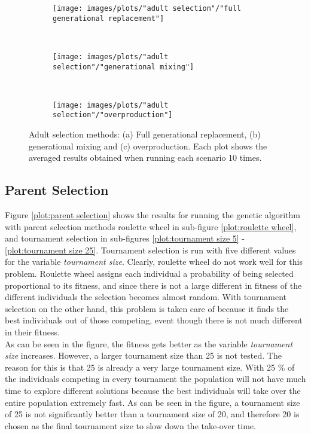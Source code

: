 \begin{figure}[h!]
    \centering
    \begin{subfigure}[b]{0.31\textwidth}
        \texttt{[image: images/plots/"adult selection"/"full generational replacement"]}
        \caption{}
        \hfill
        \label{plot:full generational replacement}
    \end{subfigure}
    ~
    \begin{subfigure}[b]{0.31\textwidth}
        \texttt{[image: images/plots/"adult selection"/"generational mixing"]}
        \caption{}
        \hfill
        \label{plot:generational mixing}
    \end{subfigure}
    ~
    \begin{subfigure}[b]{0.31\textwidth}
        \texttt{[image: images/plots/"adult selection"/"overproduction"]}
        \caption{}
        \hfill
        \label{plot:overproduction}
    \end{subfigure}
    \caption{Adult selection methods: (a) Full generational replacement, (b) generational mixing and (c) overproduction. Each plot shows the averaged results obtained when running each scenario 10 times.}
    \label{plot:adult selection methods}
\end{figure}

\subsection{Parent Selection}
Figure \ref{plot:parent selection} shows the results for running the genetic algorithm with parent selection methods roulette wheel in sub-figure \ref{plot:roulette wheel}, and tournament selection in sub-figures \ref{plot:tournament size 5} - \ref{plot:tournament size 25}. Tournament selection is run with five different values for the variable \textit{tournament size}. Clearly, roulette wheel do not work well for this problem. Roulette wheel assigns each individual a probability of being selected proportional to its fitness, and since there is not a large different in fitness of the different individuals the selection becomes almost random. With tournament selection on the other hand, this problem is taken care of because it finds the best individuals out of those competing, event though there is not much different in their fitness.\\


\noindent As can be seen in the figure, the fitness gets better as the variable \textit{tournament size} increases. However, a larger tournament size than 25 is not tested. The reason for this is that 25 is already a very large tournament size. With 25 \% of the individuals competing in every tournament the population will not have much time to explore different solutions because the best individuals will take over the entire population extremely fast. As can be seen in the figure, a tournament size of 25 is not significantly better than a tournament size of 20, and therefore 20 is chosen as the final tournament size to slow down the take-over time. \\


